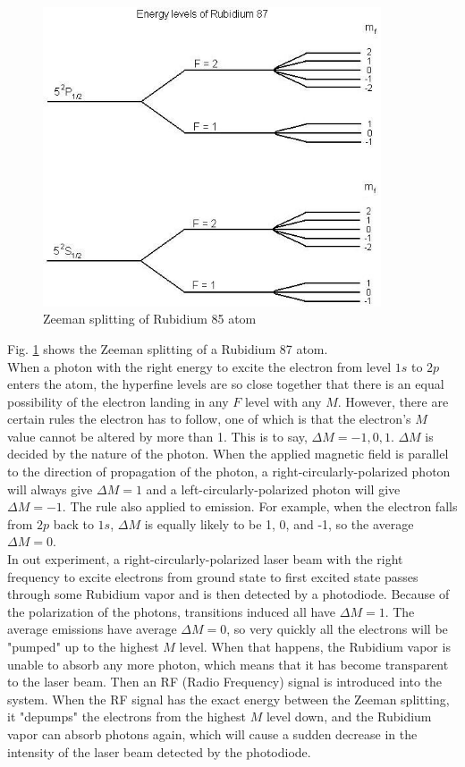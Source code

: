 \documentclass[prb,preprint]{revtex4-1}
\begin{document}
\begin{figure}[h]
\centering
\includegraphics[width=10cm]{energylevels.jpg}
\caption{Zeeman splitting of Rubidium 85 atom \cite{energy}}
\label{energylevels}
\end{figure}

Fig. \ref{energylevels} shows the Zeeman splitting of a Rubidium 87 atom. \\

When a photon with the right energy to excite the electron from level $1s$ to $2p$ enters the atom, the hyperfine levels are so close together that there is an equal possibility of the electron landing in any $F$ level with any $M$. However, there are certain rules the electron has to follow, one of which is that the electron's $M$ value cannot be altered by more than 1. This is to say, $\Delta M=-1, 0, 1$. $\Delta M$ is decided by the nature of the photon. When the applied magnetic field is parallel to the direction of propagation of the photon, a right-circularly-polarized photon will always give $\Delta M=1$ and a left-circularly-polarized photon will give $\Delta M=-1$. The rule also applied to emission. For example, when the electron falls from $2p$ back to $1s$, $\Delta M$ is equally likely to be 1, 0, and -1, so the average $\Delta M=0$. \\

In out experiment, a right-circularly-polarized laser beam with the right frequency to excite electrons from ground state to first excited state passes through some Rubidium vapor and is then detected by a photodiode. Because of the polarization of the photons, transitions induced all have $\Delta M=1$. The average emissions have average $\Delta M=0$, so very quickly all the electrons will be "pumped" up to the highest $M$ level. When that happens, the Rubidium vapor is unable to absorb any more photon, which means that it has become transparent to the laser beam. Then an RF (Radio Frequency) signal is introduced into the system. When the RF signal has the exact energy between the Zeeman splitting, it "depumps" the electrons from the highest $M$ level down, and the Rubidium vapor can absorb photons again, which will cause a sudden decrease in the intensity of the laser beam detected by the photodiode. \\
\end{document}
